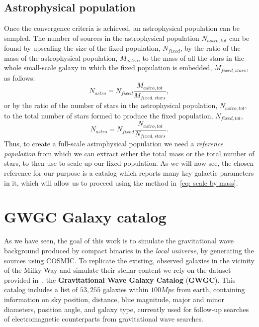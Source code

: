 \subsection{Astrophysical population}
Once the convergence criteria is achieved, an astrophysical population can be sampled. 
The number of sources in the astrophysical population $N_{astro, tot}$ can be found by upscaling the size of the fixed population, $N_{fixed}$, by the ratio of the mass of the astrophysical population, $M_{astro}$, to the mass of all the stars in the whole small-scale galaxy in which the fixed population is embedded, $M_{fixed,stars}$, as follows:
\begin{equation}
    N_{astro} = N_{fixed}\frac{M_{astro, tot}}{M_{fixed, stars}},
    \label{eq: scale by mass}
\end{equation}
or by the ratio of the number of stars in the astrophysical
population, $N_{astro, tot}$, to the total number of stars formed to produce the fixed population, $N_{fixed,tot}$,
\begin{equation}
    N_{astro} = N_{fixed}\frac{N_{astro, tot}}{N_{fixed, stars}}.
    \label{eq: scale by number}
\end{equation}
Thus, to create a full-scale astrophysical population we need a \textit{reference population} from which we can extract either the total mass or the total number of stars, to then use to scale up our fixed population.
As we will now see, the chosen reference for our purpose is a catalog which reports many key galactic parameters in it, which will allow us to proceed using the method in~\eqref{eq: scale by mass}.



\section{GWGC Galaxy catalog}
As we have seen, the goal of this work is to simulate the gravitational wave background produced by compact binaries in the \textit{local universe}, by generating the sources using COSMIC.
To replicate the existing, observed galaxies in the vicinity of the Milky Way and simulate their stellar content we rely on the dataset provided in~\cite{GWGC}, the \textbf{Gravitational Wave Galaxy Catalog} (\textbf{GWGC}).
This catalog includes a list of $53,255$ galaxies within $100Mpc$ from earth, containing information on sky position, distance, blue magnitude, major and minor diameters, position angle, and galaxy type, currently used for follow-up searches of electromagnetic counterparts from gravitational wave searches.

